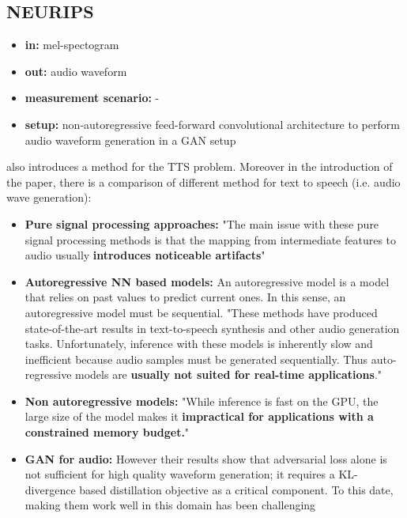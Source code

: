 \documentclass{article}
\begin{document}
\subsection{NEURIPS}

\begin{itemize}
    \item \textbf{in:} mel-spectogram 
    \item \textbf{out:} audio waveform
    \item \textbf{measurement scenario:} -
    \item \textbf{setup:} non-autoregressive feed-forward convolutional architecture to
    perform audio waveform generation in a GAN setup
\end{itemize}

\cite{NEURIPS2019_6804c9bc} also introduces a method for the TTS problem. Moreover in the introduction of the paper, there is a comparison of different method for text to speech (i.e. audio wave generation):

\begin{itemize}
    \item \textbf{Pure signal processing approaches:} "The main issue with these pure signal processing methods is that the mapping from intermediate features to audio usually \textbf{introduces noticeable artifacts}"
    \item \textbf{Autoregressive NN based models:} An autoregressive model is a model that relies on past values to predict current ones. In this sense, an autoregressive model must be sequential. "These methods have produced state-of-the-art results in text-to-speech synthesis and other audio generation tasks. Unfortunately, inference with these models is inherently slow and inefficient because audio samples must be generated sequentially. Thus auto-regressive models are \textbf{usually not suited for real-time applications}."

    \item \textbf{Non autoregressive models:} "While inference is fast on the GPU, the large size of the model makes it \textbf{ impractical for applications with a constrained memory budget.}"
    \item \textbf{GAN for audio:} However their results show that adversarial loss alone is not sufficient for high quality waveform generation; it requires a  KL-divergence based distillation objective as a critical component. To this date, making them work well in this domain has been challenging
\end{itemize}
\end{document}
